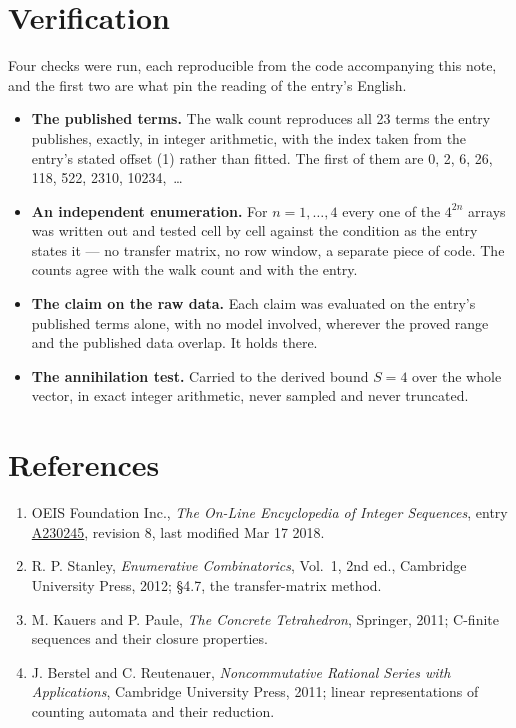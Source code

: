 \documentclass[11pt]{article}
\theoremstyle{definition}
\begin{document}
\section{Verification}

Four checks were run, each reproducible from the code accompanying this note, and the first two are what pin the reading of the entry's English.

\begin{itemize}

\item {\bfseries The published terms.} The walk count reproduces all 23 terms the entry publishes, exactly, in integer arithmetic, with the index taken from the entry's stated offset (1) rather than fitted. The first of them are 0, 2, 6, 26, 118, 522, 2310, 10234,~\dots

\item {\bfseries An independent enumeration.} For $n = 1,\dots,4$ every one of the $4^{2n}$ arrays was written out and tested cell by cell against the condition as the entry states it --- no transfer matrix, no row window, a separate piece of code. The counts agree with the walk count and with the entry.

\item {\bfseries The claim on the raw data.} Each claim was evaluated on the entry's published terms alone, with no model involved, wherever the proved range and the published data overlap. It holds there.

\item {\bfseries The annihilation test.} Carried to the derived bound $S = 4$ over the whole vector, in exact integer arithmetic, never sampled and never truncated.

\end{itemize}

\section{References}

\begin{enumerate}

\item OEIS Foundation Inc., \emph{The On-Line Encyclopedia of Integer Sequences}, entry \href{https://oeis.org/A230245}{A230245}, revision 8, last modified Mar 17 2018.

\item R. P. Stanley, \emph{Enumerative Combinatorics}, Vol.~1, 2nd ed., Cambridge University Press, 2012; \S4.7, the transfer-matrix method.

\item M. Kauers and P. Paule, \emph{The Concrete Tetrahedron}, Springer, 2011; C-finite sequences and their closure properties.

\item J. Berstel and C. Reutenauer, \emph{Noncommutative Rational Series with Applications}, Cambridge University Press, 2011; linear representations of counting automata and their reduction.

\end{enumerate}
\end{document}
